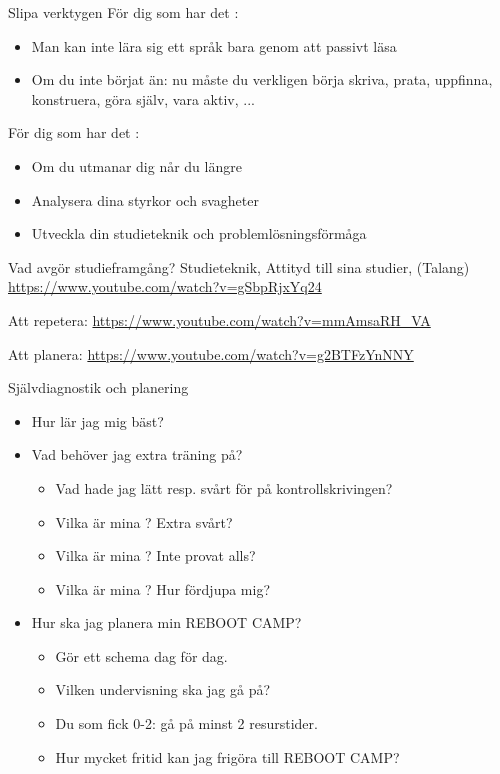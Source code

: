 
\begin{Slide}{Slipa verktygen}
För dig som har det :
\begin{itemize}
\item Man kan inte lära sig ett språk bara genom att passivt läsa
\item Om du inte börjat än: nu måste du verkligen börja skriva, prata, uppfinna, konstruera, göra själv, vara aktiv, ...
\end{itemize}
För dig som har det :
\begin{itemize}
\item Om du utmanar dig når du  längre
\item Analysera dina styrkor och svagheter
\item Utveckla din studieteknik och problemlösningsförmåga
\end{itemize}
\end{Slide}

\begin{Slide}{Vad avgör studieframgång?}
Studieteknik, Attityd till sina studier, (Talang)
\url{https://www.youtube.com/watch?v=gSbpRjxYq24}

\vspace{2em} Att repetera:
\url{https://www.youtube.com/watch?v=mmAmsaRH_VA}

\vspace{2em} Att planera:
\url{https://www.youtube.com/watch?v=g2BTFzYnNNY}
\end{Slide}

\begin{Slide}{Självdiagnostik och planering}
\begin{itemize}
\item Hur lär jag mig bäst?
\item Vad behöver jag extra träning på?
\begin{itemize}
\item Vad hade jag lätt resp. svårt för på kontrollskrivingen?
\item Vilka är mina ? Extra svårt?
\item Vilka är mina ? Inte provat alls?
\item Vilka är mina ? Hur fördjupa mig?
\end{itemize}
\item Hur ska jag planera min REBOOT CAMP?
\begin{itemize}
\item Gör ett schema dag för dag. 
\item Vilken undervisning ska jag gå på?
\item Du som fick 0-2: gå på minst 2 resurstider. 
\item Hur mycket fritid kan jag frigöra till REBOOT CAMP?
\end{itemize}
\end{itemize}
\end{Slide}

